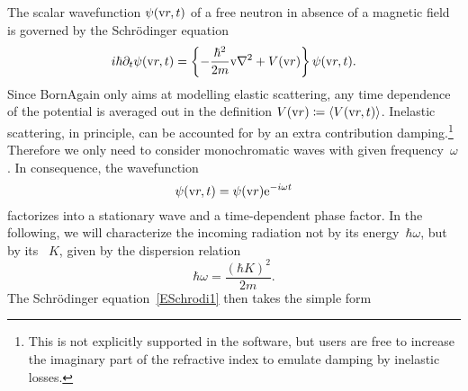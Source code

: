 %
The scalar wavefunction $\psi(\text{v}{r},t)$
%
%
%
of a free neutron
in absence of a magnetic field
is governed by the Schrödinger equation
\begin{equation}\label{ESchrodi1}
  i\hbar\partial_t \psi(\text{v}{r},t)
  = \left\{-\frac{\hbar^2}{2m}\text{v}{\nabla}^2+V(\text{v}{r})\right\} \psi(\text{v}{r},t).
\end{equation}
Since BornAgain only aims at modelling elastic scattering,
%
any time dependence of the potential is averaged out in the definition
%
%
$V(\text{v}{r})\coloneqq \langle V(\text{v}{r},t)\rangle$.
%
%
Inelastic scattering,
%
%
%
%
in principle, can be accounted for by an extra contribution
damping.\footnote
{This is not explicitly supported in the software,
but users are free to increase the imaginary part of the refractive index
%
to emulate damping by inelastic losses.\label{Flosses}}
Therefore we only need to consider monochromatic waves
%
%
with given frequency~$\omega$.
%
In consequence, the wavefunction
\begin{equation}\label{Estationarywave}
  \psi(\text{v}{r},t) = \psi(\text{v}{r})\mathrm e^{-i\omega t}
\end{equation}
%
factorizes into a stationary wave and a time-dependent phase factor.
%
%
In the following, we will characterize the incoming radiation
not by its energy~$\hbar\omega$,
but by its ~$K$,
%
%
%
given by the dispersion relation
%
%
\begin{equation}
  \hbar\omega = \frac{(\hbar K)^2}{2m}.
\end{equation}
The Schrödinger equation~\cref{ESchrodi1} then takes the simple form
